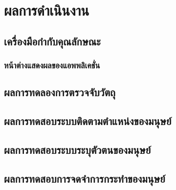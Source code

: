 \chapter{ผลการดำเนินงาน}
\section{เครื่องมือกำกับคุณลักษณะ}
\subsection{หน้าต่างแสดงผลของแอพพลิเคชั่น}


\clearpage
\section{ผลการทดลองการตรวจจับวัตถุ}

\clearpage
\section{ผลการทดสอบระบบติดตามตำแหน่งของมนุษย์}


\section{ผลการทดสอบระบบระบุตัวตนของมนุษย์}


\section{ผลการทดสอบการจดจำการกระทำของมนุษย์}


%

%